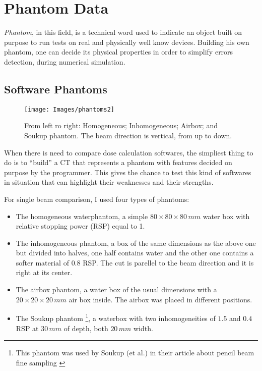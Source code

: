 \documentclass[12pt, a4paper, twoside]{book}
\begin{document}

\section{Phantom Data}\label{phantoms}
\emph{Phantom}, in this field, is a technical word used to indicate an object built on purpose to run tests on real and physically well know devices. Building his own phantom, one can decide its physical properties in order to simplify errors detection, during numerical simulation. 

\subsection{Software Phantoms}
\label{sec:pha}
\begin{figure}[h]
{\texttt{[image: Images/phantoms2]}}
\caption{From left ro right: Homogeneous; Inhomogeneous; Airbox; and Soukup phantom. The beam direction is vertical, from up to down.}
\label{fig:phantoms}
\end{figure}
When there is need to compare dose calculation softwares, the simpliest thing to do is to ``build'' a CT that represents a phantom with features decided on purpose by the programmer. This gives the chance to test this kind of softwares in situation that can highlight their weaknesses and their strengths.


For single beam comparison, I used four types of phantoms:
\begin{itemize}
\item The homogeneous waterphantom, a simple $80\times80\times80\,mm$ water box with relative stopping power (RSP) equal to 1.
\item The inhomogeneous phantom, a box of the same dimensions as the above one but divided into halves, one half contains water and the other one contains a softer material of $0.8$ RSP. The cut is parellel to the beam direction and it is right at its center.
\item The airbox phantom, a water box of the usual dimensions with a $20\times20\times20\,mm$ air box inside. The airbox was placed in different positions.
\item The Soukup phantom \footnote{This phantom was used by Soukup (et al.) in their article about pencil beam fine sampling \cite{souk:pba}}, a waterbox with two inhomogeneities of $1.5$ and $0.4$ RSP at $30\,mm$ of depth, both $20\,mm$ width.
\end{itemize}
\end{document}
